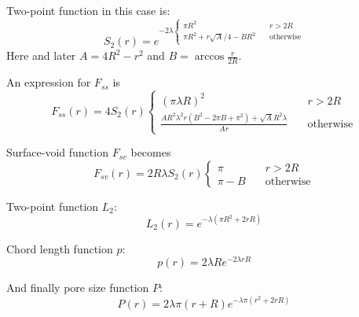 \documentclass[reprint,amsmath,amssymb,aps,pre,showkeys,showpacs,nofootinbib]{revtex4-1}
\begin{document}
Two-point function in this case is: \cite{Torquato_book}
\begin{equation*}
  S_2(r) = e^{-2\lambda \left\{
  \begin{array}{ll}
    \pi R^2 & \quad r > 2R \\
    \pi R^2 + r\sqrt{A}/4 - BR^2 & \quad \text{otherwise}
  \end{array}
  \right.}
\end{equation*}
Here and later $A = 4R^2 - r^2$ and $B = \arccos \frac{r}{2R}$.

An expression for $F_{ss}$ is
\begin{equation*}
  F_{ss}(r) = 4S_2(r) \left\{
  \begin{array}{ll}
    (\pi\lambda R)^2 & \quad r > 2R \\
    \frac{AR^2\lambda^2 r(B^2 - 2\pi B + \pi^2) + \sqrt{A}R^2\lambda}{Ar} & \quad \text{otherwise}
  \end{array}
  \right.
\end{equation*}

Surface-void function $F_{sv}$ becomes
\begin{equation*}
  F_{sv}(r) = 2R\lambda S_2(r) \left\{
  \begin{array}{ll}
    \pi & \quad r > 2R \\
    \pi-B & \quad \text{otherwise}
  \end{array}
  \right.
\end{equation*}

Two-point function $L_2$:
\begin{equation*}
  L_2(r) = e^{-\lambda(\pi R^2 + 2rR)}
\end{equation*}

Chord length function $p$:
\begin{equation*}
  p(r) = 2\lambda R e^{-2\lambda rR}
\end{equation*}

And finally pore size function $P$:
\begin{equation*}
  P(r) = 2\lambda\pi (r+R) e^{-\lambda\pi(r^2 + 2rR)}
\end{equation*}
\end{document}
